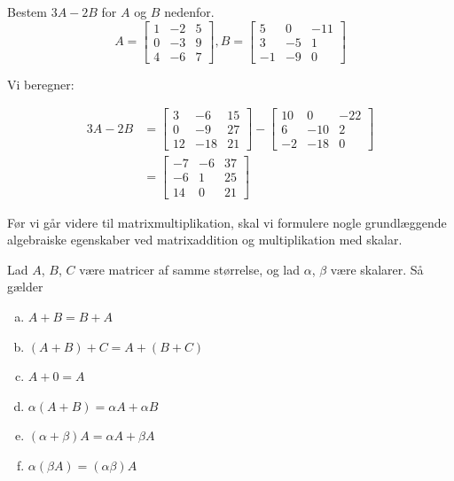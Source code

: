 \begin{example}
Bestem $3A-2B$ for $A$ og $B$ nedenfor.
\[
    A=\left[\begin{array}{lll}
    1 & -2 & 5 \\
    0 & -3 & 9 \\
    4 & -6 & 7
    \end{array}\right], B=\left[\begin{array}{ccc}
    5 & 0 & -11 \\
    3 & -5 & 1 \\
    -1 & -9 & 0
    \end{array}\right]
    \]
    
\end{example}

\begin{solution}
    Vi beregner:

    \[
\begin{aligned}
3 A-2 B & =\left[\begin{array}{ccc}
3 & -6 & 15 \\
0 & -9 & 27 \\
12 & -18 & 21
\end{array}\right]-\left[\begin{array}{ccc}
10 & 0 & -22 \\
6 & -10 & 2 \\
-2 & -18 & 0
\end{array}\right] \\
& =\left[\begin{array}{ccc}
-7 & -6 & 37 \\
-6 & 1 & 25 \\
14 & 0 & 21
\end{array}\right]
\end{aligned}
\]
\end{solution}

Før vi går videre til matrixmultiplikation, skal vi formulere nogle grundlæggende algebraiske egenskaber ved matrixaddition og multiplikation med skalar.

\begin{theorem}

    Lad $A$, $B$, $C$ være matricer af samme størrelse, og lad $\alpha$, $\beta$ være skalarer. Så gælder
    \begin{enumerate}[(a)]
        \item $A+B=B+A$
        \item $(A+B)+C=A+(B+C)$
        \item $A+0=A$
        \item $\alpha(A+B)=\alpha A+\alpha B$
        \item $(\alpha+\beta) A=\alpha A+\beta A$
        \item $\alpha(\beta A)=(\alpha \beta) A$
    \end{enumerate}
\end{theorem}

